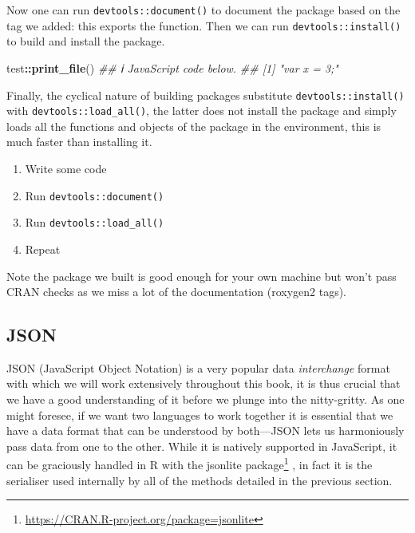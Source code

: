 \documentclass[
]{krantz}
\makeatletter
\newenvironment{Shaded}{\begin{snugshade}}{\end{snugshade}}
\newcommand{\CommentTok}[1]{\textcolor[rgb]{0.37,0.37,0.37}{\textit{#1}}}
\newcommand{\KeywordTok}[1]{\textcolor[rgb]{0.27,0.27,0.27}{\textbf{#1}}}
\newcommand{\NormalTok}[1]{#1}
\newcommand{\OperatorTok}[1]{\textcolor[rgb]{0.43,0.43,0.43}{\textbf{#1}}}
\providecommand{\tightlist}{%
  \setlength{\itemsep}{0pt}\setlength{\parskip}{0pt}}
\renewcommand{\href}[2]{#2\footnote{\url{#1}}}
\newenvironment{kframe}{%
\medskip{}
\setlength{\fboxsep}{.8em}
 \def\at@end@of@kframe{}%
 \ifinner\ifhmode%
  \def\at@end@of@kframe{\end{minipage}}%
  \begin{minipage}{\columnwidth}%
 \fi\fi%
 \def\FrameCommand##1{\hskip\@totalleftmargin \hskip-\fboxsep
 \colorbox{shadecolor}{##1}\hskip-\fboxsep
     \hskip-\linewidth \hskip-\@totalleftmargin \hskip\columnwidth}%
 \MakeFramed {\advance\hsize-\width
   \@totalleftmargin\z@ \linewidth\hsize
   \@setminipage}}%
 {\par\unskip\endMakeFramed%
 \at@end@of@kframe}
\renewenvironment{Shaded}{\begin{kframe}}{\end{kframe}}
\makeatother
\begin{document}
Now one can run \texttt{devtools::document()} to document the package based on the tag we added: this exports the function. Then we can run \texttt{devtools::install()} to build and install the package.

\begin{Shaded}
\begin{Highlighting}[]
\NormalTok{test}\OperatorTok{::}\KeywordTok{print\_file}\NormalTok{()}
\CommentTok{\#\# ℹ JavaScript code below.}
\CommentTok{\#\# [1] "var x = 3;"}
\end{Highlighting}
\end{Shaded}

Finally, the cyclical nature of building packages substitute \texttt{devtools::install()} with \texttt{devtools::load\_all()}, the latter does not install the package and simply loads all the functions and objects of the package in the environment, this is much faster than installing it.

\begin{enumerate}
\def\labelenumi{\arabic{enumi}.}
\tightlist
\item
  Write some code
\item
  Run \texttt{devtools::document()}
\item
  Run \texttt{devtools::load\_all()}
\item
  Repeat
\end{enumerate}

Note the package we built is good enough for your own machine but won't pass CRAN checks as we miss a lot of the documentation (roxygen2 tags).

\hypertarget{json}{%
\subsection*{JSON}\label{json}}


JSON (JavaScript Object Notation) is a very popular data \emph{interchange} format with which we will work extensively throughout this book, it is thus crucial that we have a good understanding of it before we plunge into the nitty-gritty. As one might foresee, if we want two languages to work together it is essential that we have a data format that can be understood by both---JSON lets us harmoniously pass data from one to the other. While it is natively supported in JavaScript, it can be graciously handled in R with the \href{https://CRAN.R-project.org/package=jsonlite}{jsonlite package} \citep{R-jsonlite}, in fact it is the serialiser used internally by all of the methods detailed in the previous section.
\end{document}
